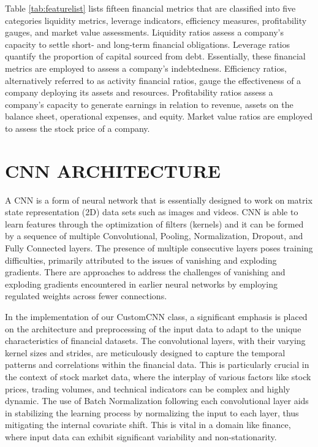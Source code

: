 {Table \ref{tab:featurelist} lists fifteen financial metrics that are classified into five categories liquidity metrics, leverage indicators, efficiency measures, profitability gauges, and market value assessments. Liquidity ratios assess a company's capacity to settle short- and long-term financial obligations. Leverage ratios quantify the proportion of capital sourced from debt. Essentially, these financial metrics are employed to assess a company's indebtedness. Efficiency ratios, alternatively referred to as activity financial ratios, gauge the effectiveness of a company deploying its assets and resources. Profitability ratios assess a company's capacity to generate earnings in relation to revenue, assets on the balance sheet, operational expenses, and equity. Market value ratios are employed to assess the stock price of a company.










\section{CNN ARCHITECTURE }
A CNN is a  form of neural network that is essentially designed to work on matrix state representation (2D) data sets such as images and videos. CNN is able to learn features through the optimization of filters (kernels) and it can be formed by a sequence of multiple Convolutional, Pooling, Normalization, Dropout, and Fully Connected layers. The presence of multiple consecutive layers poses training difficulties, primarily attributed to the issues of vanishing and exploding gradients. There are approaches to address the challenges of vanishing and exploding gradients encountered in earlier neural networks by employing regulated weights across fewer connections.

In the implementation of our CustomCNN class, a significant emphasis is placed on the architecture and preprocessing of the input data to adapt to the unique characteristics of financial datasets. The convolutional layers, with their varying kernel sizes and strides, are meticulously designed to capture the temporal patterns and correlations within the financial data. This is particularly crucial in the context of stock market data, where the interplay of various factors like stock prices, trading volumes, and technical indicators can be complex and highly dynamic. The use of Batch Normalization following each convolutional layer aids in stabilizing the learning process by normalizing the input to each layer, thus mitigating the internal covariate shift. This is vital in a domain like finance, where input data can exhibit significant variability and non-stationarity.

}
